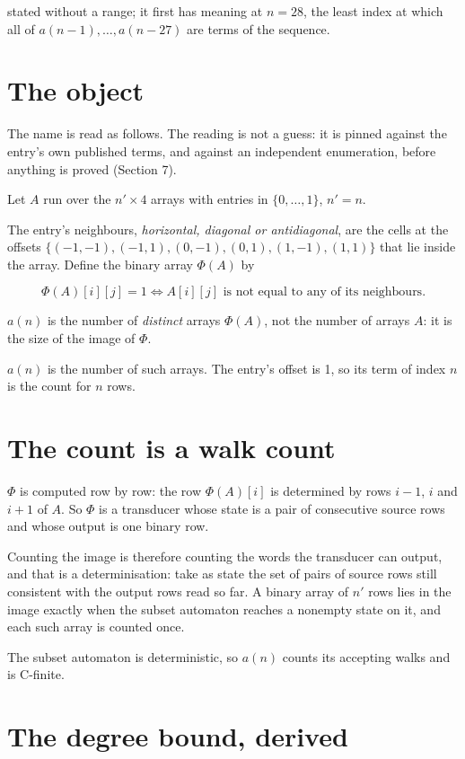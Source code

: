 \documentclass[11pt]{article}
\theoremstyle{definition}
\begin{document}
stated without a range; it first has meaning at $n = 28$, the least index at which all of $a(n-1),\dots,a(n-27)$ are terms of the sequence.

\section{The object}

The name is read as follows. The reading is not a guess: it is pinned against the entry's own published terms, and against an independent enumeration, before anything is proved (Section 7).

Let $A$ run over the $n' \times 4$ arrays with entries in $\{0,\dots,1\}$, $n' = n$.

The entry's neighbours, {\itshape horizontal, diagonal or antidiagonal}, are the cells at the offsets $\{(-1,-1), (-1,1), (0,-1), (0,1), (1,-1), (1,1)\}$ that lie inside the array. Define the binary array $\Phi(A)$ by

\[\Phi(A)[i][j] = 1 \iff A[i][j] \text{ is not equal to any of its neighbours}.\]

$a(n)$ is the number of {\itshape distinct} arrays $\Phi(A)$, not the number of arrays $A$: it is the size of the image of $\Phi$.

$a(n)$ is the number of such arrays. The entry's offset is 1, so its term of index $n$ is the count for $n$ rows.

\section{The count is a walk count}

$\Phi$ is computed row by row: the row $\Phi(A)[i]$ is determined by rows $i-1$, $i$ and $i+1$ of $A$. So $\Phi$ is a transducer whose state is a pair of consecutive source rows and whose output is one binary row.

Counting the image is therefore counting the words the transducer can output, and that is a determinisation: take as state the set of pairs of source rows still consistent with the output rows read so far. A binary array of $n'$ rows lies in the image exactly when the subset automaton reaches a nonempty state on it, and each such array is counted once.

The subset automaton is deterministic, so $a(n)$ counts its accepting walks and is C-finite.

\section{The degree bound, derived}
\end{document}
